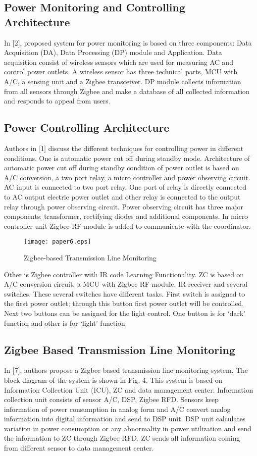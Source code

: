 \documentclass[10pt, conference, compsocconf]{IEEEtran}
\begin{document}
\subsection{Power Monitoring and Controlling Architecture}
In [2], proposed system for power monitoring is based on three components: Data Acquisition (DA), Data Processing (DP) module and Application. Data acquisition consist of wireless sensors which are used for measuring AC and control power outlets. A wireless sensor has three technical parts, MCU with A/C, a sensing unit and a Zigbee transceiver. DP module collects information from all sensors through Zigbee and make a database of all collected information and responds to appeal from users.

\subsection{Power Controlling Architecture}
Authors in [1] discuss the different techniques for controlling power in different conditions. One is automatic power cut off during standby mode. Architecture of automatic power cut off during standby condition of power outlet is based on A/C conversion, a two port relay, a micro controller and power observing circuit. AC input is connected to two port relay. One port of relay is directly connected to AC output electric power outlet and other relay is connected to the output relay through power observing circuit. Power observing circuit has three major components: transformer, rectifying diodes and additional components. In micro controller unit Zigbee RF module is added to communicate with the coordinator.

 \begin{figure*}[t]
\centering
  \texttt{[image: paper6.eps]}
  \caption{Zigbee-based Transmission Line Monitoring}
\end{figure*}

Other is Zigbee controller with IR code Learning Functionality. ZC is based on A/C conversion circuit, a MCU with Zigbee RF module, IR receiver and several switches. These several switches have different tasks. First switch is assigned to the first power outlet; through this button first power outlet will be controlled. Next two buttons can be assigned for the light control. One button is for `dark' function and other is for `light' function.

\subsection{Zigbee Based Transmission Line Monitoring}
In [7], authors propose a Zigbee based transmission line monitoring system. The block diagram of the system is shown in Fig. 4. This system is based on Information Collection Unit (ICU), ZC and data management center. Information collection unit consists of sensor A/C, DSP, Zigbee RFD. Sensors keep information of power consumption in analog form and A/C convert analog information into digital information and send to DSP unit. DSP unit calculates variation in power consumption or any abnormality in power utilization and send the information to ZC through Zigbee RFD. ZC sends all information coming from different sensor to data management center.
\end{document}

